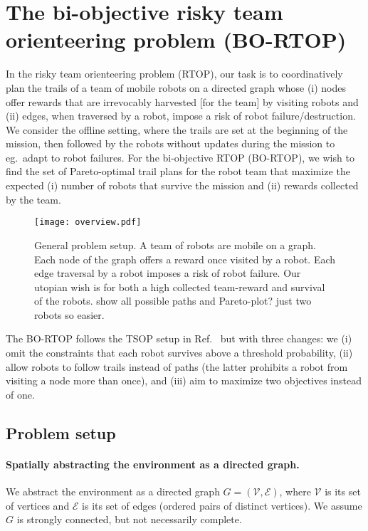 \documentclass[11pt, oneside]{article}
\begin{document}
\section{The bi-objective risky team orienteering problem (BO-RTOP)}
In the risky team orienteering problem (RTOP), our task is to coordinatively plan the trails of a team of mobile robots on a directed graph whose (i) nodes offer rewards that are irrevocably harvested [for the team] by visiting robots and (ii) edges, when traversed by a robot, impose a risk of robot failure/destruction.
We consider the offline setting, where the trails are set at the beginning of the mission, then followed by the robots without updates during the mission to eg.\ adapt to robot failures. 
For the bi-objective RTOP (BO-RTOP), we wish to find the set of Pareto-optimal trail plans for the robot team that maximize the expected (i) number of robots that survive the mission and (ii) rewards collected by the team.

\begin{figure}[h!]
    \centering
    \texttt{[image: overview.pdf]}
    \caption{
       General problem setup. A team of robots are mobile on a graph. Each node of the graph offers a reward once visited by a robot. Each edge traversal by a robot imposes a risk of robot failure. Our utopian wish is for both a high collected team-reward and survival of the robots. {\color{red} show all possible paths and Pareto-plot? just two robots so easier.}
    }
    \label{fig:overview}
\end{figure}

The BO-RTOP follows the TSOP setup in Ref.~\cite{jorgensen2018team} but with three changes: we (i) omit the constraints that each robot survives above a threshold probability, (ii) allow robots to follow trails instead of paths (the latter prohibits a robot from visiting a node more than once), and (iii) aim to maximize two objectives instead of one.

\subsection{Problem setup}


\paragraph{Spatially abstracting the environment as a directed graph.}
We abstract the environment as a directed graph $G=(\mathcal{V}, \mathcal{E})$, where $\mathcal{V}$ is its set of vertices and $\mathcal{E}$ is its set of edges (ordered pairs of distinct vertices). We assume $G$ is strongly connected, but not necessarily complete.
\end{document}

